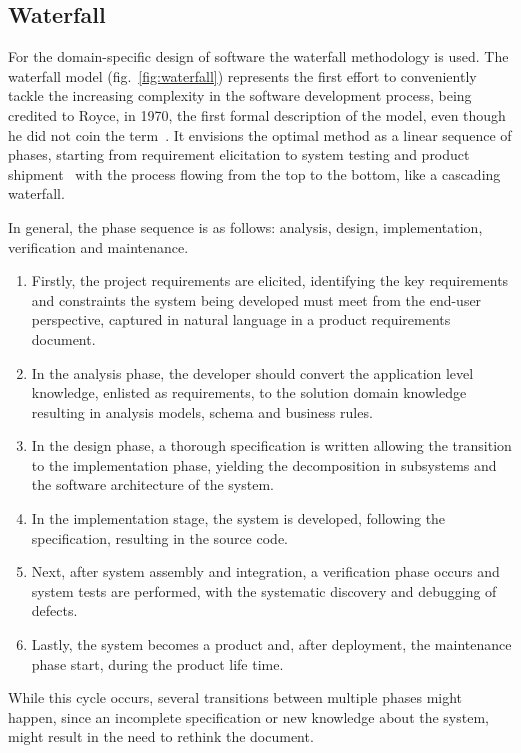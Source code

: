 \subsection{Waterfall}%
\label{subsec:waterfall}
For the domain-specific design of software the waterfall methodology is used.
The waterfall model (fig.~\ref{fig:waterfall}) represents the first effort to
conveniently tackle the increasing complexity in the software development
process, being credited to Royce, in 1970, the first formal description of the
model, even though he did not coin the term~\cite{sommerville1996software}. It
envisions the optimal method
as a linear sequence of phases, starting from requirement elicitation to system
testing and product shipment~\cite{cusumano1995beyond} with the process flowing
from the top to the bottom, like a cascading waterfall.

In general, the phase sequence is as follows: analysis, design, implementation,
verification and maintenance.
\begin{enumerate}
  \item Firstly, the project requirements are elicited, identifying the key
    requirements and constraints the system being developed must meet from the
    end-user perspective, captured in natural language in a product requirements document.
  \item In the analysis phase, the developer should convert the application
    level knowledge, enlisted as requirements, to the solution domain knowledge
    resulting in analysis models, schema and business rules.
  \item In the design phase, a thorough specification is written allowing the
    transition to the implementation phase, yielding the decomposition in
    subsystems and the software architecture of the system. 
  \item In the implementation stage, the system is developed, following the
    specification, resulting in the source code.
  \item Next, after system assembly and integration, a verification phase occurs
    and system tests are performed, with the systematic discovery and debugging
    of defects.
  \item Lastly, the system becomes a product and, after deployment, the
    maintenance phase start, during the product life time.
\end{enumerate}
While this cycle occurs, several transitions between multiple phases might
happen, since an incomplete specification or new knowledge about the system,
might result in the need to rethink the document.

